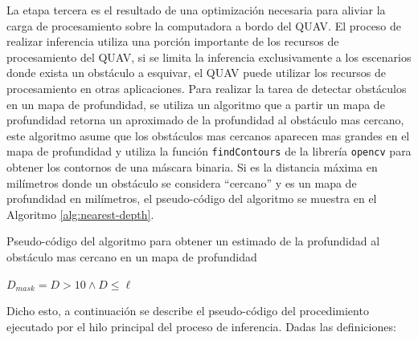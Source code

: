 La etapa tercera es el resultado de una optimización necesaria para aliviar la carga de procesamiento sobre la computadora a bordo del QUAV. El proceso de realizar inferencia utiliza una porción importante de los recursos de procesamiento del QUAV, si se limita la inferencia exclusivamente a los escenarios donde exista un obstáculo a esquivar, el QUAV puede utilizar los recursos de procesamiento en otras aplicaciones. Para realizar la tarea de detectar obstáculos en un mapa de profundidad, se utiliza un algoritmo que a partir un mapa de profundidad retorna un aproximado de la profundidad al obstáculo mas cercano, este algoritmo asume que los obstáculos mas cercanos aparecen mas grandes en el mapa de profundidad y utiliza la función \texttt{findContours} de la librería \texttt{opencv} \cite{bradski2000opencv} para obtener los contornos de una máscara binaria. Si \jim{\ell} es la distancia máxima en milímetros donde un obstáculo se considera ``cercano'' y  es un mapa de profundidad en milímetros, el pseudo-código del algoritmo se muestra en el Algoritmo \ref{alg:nearest-depth}.

\begin{algorithm}
\caption{Pseudo-código del algoritmo para obtener un estimado de la profundidad al obstáculo mas cercano en un mapa de profundidad }
\label{alg:nearest-depth}

$D_{mask} = D > 10 \wedge D \leq \ell$


\Return{\jim{\infty}}

\end{algorithm}

Dicho esto, a continuación se describe el pseudo-código del procedimiento ejecutado por el hilo principal del proceso de inferencia. Dadas las definiciones:

